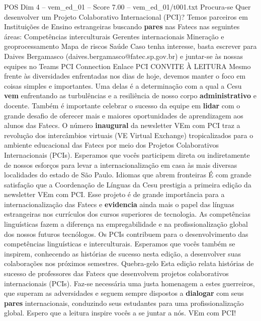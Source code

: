 \begin{textsample}{POS Dim 4 – vem\_ed\_01 – Score 7.00 – vem\_ed\_01/t001.txt}  \label{ex:f4_pos_015}
Procura-se Quer desenvolver um Projeto Colaborativo Internacional (PCI)?
Temos parceiros em Instituições de Ensino estrangeiras buscando \textbf{pares} nas Fatecs nas seguintes áreas: Competências interculturais Gerentes internacionais Mineração e geoprocessamento Mapa de riscos Saúde Caso tenha interesse, basta escrever para Daives Bergamasco (daives.bergamasco@fatec.sp.gov.br) e juntar-se às nossas equipes no Teams PCI Connection Enlace PCI CONVITE À LEITURA Mesmo frente às diversidades enfrentadas nos dias de hoje, devemos manter o foco em coisas simples e importantes.
Uma delas é a determinação com a qual a Cesu \textbf{vem} enfrentando as turbulências e a resiliência de nosso corpo \textbf{administrativo} e docente.
Também é importante celebrar o sucesso da equipe em \textbf{lidar} com o grande desafio de oferecer mais e maiores oportunidades de aprendizagem aos alunos das Fatecs.
O número \textbf{inaugural} da newsletter VEm com PCI traz a revolução dos intercâmbios virtuais (VE Virtual Exchange) tropicalizados para o ambiente educacional das Fatecs por meio dos Projetos Colaborativos Internacionais (PCIs).
Esperamos que vocês participem direta ou indiretamente de nossos esforços para levar a internacionalização em casa às mais diversas localidades do estado de São Paulo.
Idiomas que abrem fronteiras É com grande satisfação que a Coordenação de Línguas da Cesu prestigia a primeira edição da newsletter VEm com PCI.
Esse projeto é de grande importância para a internacionalização das Fatecs e \textbf{evidencia} ainda mais o papel das línguas estrangeiras nos currículos dos cursos superiores de tecnologia.
As competências linguísticas fazem a diferença na empregabilidade e na profissionalização global dos nossos futuros tecnólogos.
Os PCIs contribuem para o desenvolvimento das competências linguísticas e interculturais.
Esperamos que vocês também se inspirem, conhecendo as histórias de sucesso nesta edição, a desenvolver suas colaborações nos próximos semestres.
Quebra-gelo Esta edição relata histórias de sucesso de professores das Fatecs que desenvolvem projetos colaborativos internacionais (PCIs).
Faz-se necessária uma justa homenagem a estes guerreiros, que superam as adversidades e seguem sempre dispostos a \textbf{dialogar} com seus \textbf{pares} internacionais, conduzindo seus estudantes para uma profissionalização global.
Espero que a leitura inspire vocês a se juntar a nós.
VEm com PCI!

\end{textsample}
